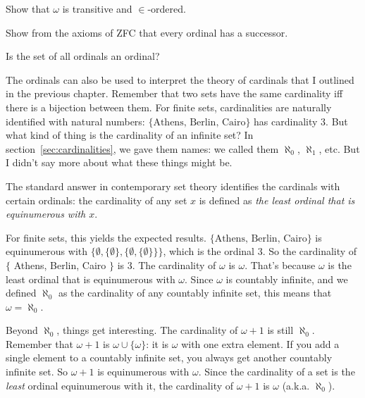 \begin{exercise}
  Show that $\omega$ is transitive and $\in$-ordered.
\end{exercise}

\begin{exercise}
  Show from the axioms of ZFC that every ordinal has a successor.
\end{exercise}

\begin{exercise}
  Is the set of all ordinals an ordinal?
\end{exercise}

The ordinals can also be used to
interpret the theory of cardinals that I outlined in the previous chapter.
Remember that two sets have the same cardinality
iff there is a bijection between them.
For finite sets,
cardinalities are naturally identified with natural numbers:
$\{ \text{Athens, Berlin, Cairo} \}$ has cardinality 3.
But what kind of thing is the cardinality of an infinite set?
In section~\ref{sec:cardinalities},
we gave them names:
we called them $\aleph_0$, $\aleph_1$, etc.
But I didn't say more about what these things might be.

The standard answer in contemporary set theory
identifies the cardinals with certain ordinals:
the cardinality of any set $x$ is defined as
\emph{the least ordinal that is equinumerous with $x$}.

For finite sets,
this yields the expected results.
$\{ \text{Athens, Berlin, Cairo} \}$ is equinumerous with $\{ \emptyset, \{ \emptyset \}, \{ \emptyset, \{ \emptyset \} \} \}$,
which is the ordinal 3.
So the cardinality of $\{$ Athens, Berlin, Cairo $\}$ is 3.
The cardinality of $\omega$ is $\omega$.
That's because $\omega$ is the least ordinal that is equinumerous with $\omega$.
Since $\omega$ is countably infinite,
and we defined $\aleph_{0}$ as the cardinality of any countably infinite set,
this means that $\omega = \aleph_0$.

Beyond $\aleph_{0}$,
things get interesting.
The cardinality of $\omega\!+\!1$ is still $\aleph_{0}$.
Remember that $\omega\!+\!1$ is $\omega \cup \{ \omega \}$:
it is $\omega$ with one extra element.
If you add a single element to a countably infinite set,
you always get another countably infinite set.
So $\omega\!+\!1$ is equinumerous with $\omega$.
Since the cardinality of a set is the \emph{least} ordinal equinumerous with it,
the cardinality of $\omega\!+\!1$ is $\omega$ (a.k.a. $\aleph_0$).

